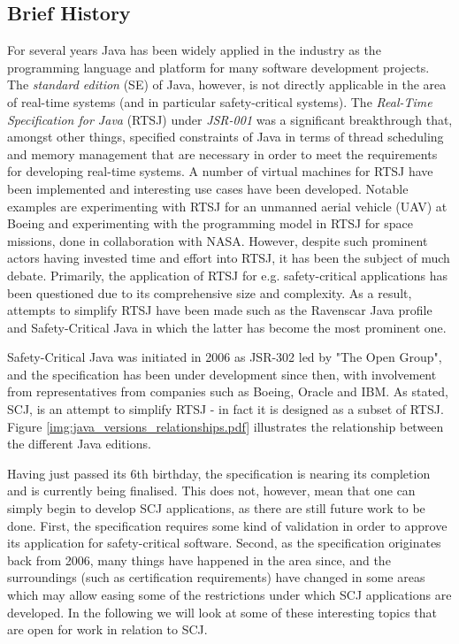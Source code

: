 \subsection{Brief History} %
\label{sub:brief_history_of_java_for_safety_critical_systems}
For several years Java has been widely applied in the industry as the programming language and platform for many software development projects. The \textit{standard edition} (SE) of Java, however, is not directly applicable in the area of real-time systems (and in particular safety-critical systems). The \textit{Real-Time Specification for Java} (RTSJ) under \textit{JSR-001}\cite{alan2001real}\cite{henties:2009-20} was a significant breakthrough that, amongst other things, specified constraints of Java in terms of thread scheduling and memory management that are necessary in order to meet the requirements for developing real-time systems. A number of virtual machines for RTSJ have been implemented and interesting use cases have been developed. Notable examples are experimenting with RTSJ for an unmanned aerial vehicle (UAV) at Boeing\cite{Armbruster:2007:RJV:1324969.1324974} and experimenting with the programming model in RTSJ for space missions, done in collaboration with NASA\cite{DBLP:conf/isorc/DvorakBCCCGIMMR04}. However, despite such prominent actors having invested time and effort into RTSJ, it has been the subject of much debate. Primarily, the application of RTSJ for e.g. safety-critical applications has been questioned due to its comprehensive size and complexity. As a result, attempts to simplify RTSJ have been made such as the Ravenscar Java profile and Safety-Critical Java in which the latter has become the most prominent one.

Safety-Critical Java was initiated in 2006 as JSR-302 led by "The Open Group", and the specification has been under development since then, with involvement from representatives from companies such as Boeing, Oracle and IBM. As stated, SCJ, is an attempt to simplify RTSJ - in fact it is designed as a subset of RTSJ. Figure \ref{img:java_versions_relationships.pdf} illustrates the relationship between the different Java editions.


Having just passed its 6th birthday, the specification is nearing its completion and is currently being finalised. This does not, however, mean that one can simply begin to develop SCJ applications, as there are still future work to be done. First, the specification requires some kind of validation in order to approve its application for safety-critical software. Second, as the specification originates back from 2006, many things have happened in the area since, and the surroundings (such as certification requirements) have changed in some areas which may allow easing some of the restrictions under which SCJ applications are developed. In the following we will look at some of these interesting topics that are open for work in relation to SCJ.

